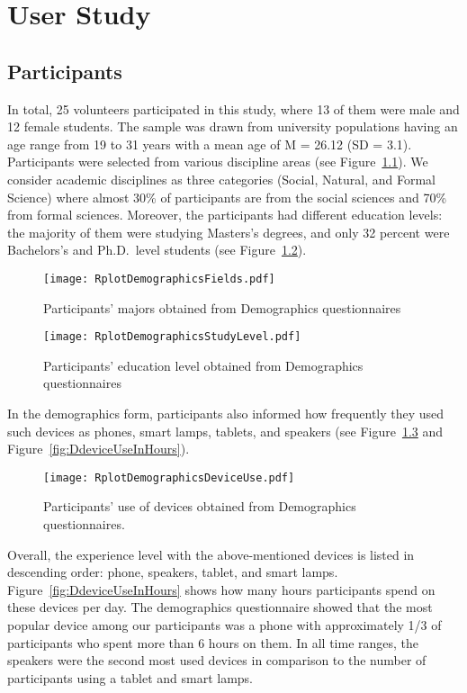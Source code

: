 \chapter{User Study}
\label{ch:user-study}

\section{Participants}
\label{sec:participants}
In total, 25 volunteers participated in this study, where 13 of them were male and 12 female students.
The sample was drawn from university populations having an age range from 19 to 31
years with a mean age of M = 26.12 (SD = 3.1).
Participants were selected from various discipline areas (see Figure~\ref{fig:Dfields}).
We consider academic disciplines as three categories (Social, Natural, and Formal Science)
where almost 30\% of participants are from the social sciences and 70\% from formal sciences.
Moreover, the participants had different education levels: the majority of
them were studying Masters’s degrees, and only 32 percent were Bachelors’s
and Ph.D.\ level students (see Figure~\ref{fig:DstudyLevels}).

\begin{figure}[H]
  \centering
    \texttt{[image: RplotDemographicsFields.pdf]}
      \caption{Participants' majors obtained from Demographics questionnaires}
      \label{fig:Dfields}
\end{figure}

\begin{figure}[H]
  \centering
    \texttt{[image: RplotDemographicsStudyLevel.pdf]}
      \caption{Participants' education level obtained from Demographics questionnaires}
      \label{fig:DstudyLevels}
\end{figure}

In the demographics form, participants also informed how frequently they used such devices as phones,
smart lamps, tablets, and speakers (see Figure~\ref{fig:DdeviceUse} and Figure~\ref{fig:DdeviceUseInHours}).

\begin{figure}[H]
  \centering
    \texttt{[image: RplotDemographicsDeviceUse.pdf]}
      \caption{Participants' use of devices obtained from Demographics questionnaires.}
      \label{fig:DdeviceUse}
\end{figure}

Overall, the experience level with the above-mentioned devices is listed in
descending order: phone, speakers, tablet, and smart lamps.
Figure~\ref{fig:DdeviceUseInHours} shows how many hours participants spend on these devices per day.
The demographics questionnaire showed that the most popular device among our participants
was a phone with approximately 1/3 of participants who spent more than 6 hours on them.
In all time ranges, the speakers were the second most used devices in
comparison to the number of participants using a tablet and smart lamps.

